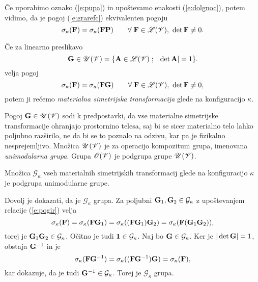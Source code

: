 Če uporabimo oznako (\ref{e:pupa}) in upoštevamo enakosti (\ref{e:dolgnoc}),
potem vidimo, da je pogoj (\ref{e:grarefc}) ekvivalenten pogoju
\begin{equation*}
	\sigma_{\kappa}(\mathbf F)=\sigma_{\kappa}(\mathbf F\mathbf P)\qquad
	\forall\;\mathbf F\in\mathscr L(\mathscr V),\ \det\mathbf F\neq 0.
\end{equation*}

\begin{definicija}
	Če za linearno preslikavo
	\[
		\ten{G}\in\mathscr{U}(\V)=\{\ten{A}\in\L(\V)\;;\ |\det\ten{A}|=1 \}.
	\]
	velja pogoj
	\begin{equation} \label{e:pogir}
		\sigma_{\kappa}(\mathbf F)=\sigma_{\kappa}(\mathbf F\mathbf G)\qquad
		\forall\;\mathbf F\in\mathscr L(\mathscr V),\ \det\mathbf F\neq 0,
	\end{equation}
	potem ji rečemo \emph{materialna simetrijska transformacija} glede na konfiguracijo $\kappa$.
\end{definicija}

Pogoj $\mathbf G\in\mathscr{U}(\mathscr V)$ sodi k predpostavki,
da vse materialne simetrijske transformacije ohranjajo prostornino telesa,
saj bi se sicer materialno telo lahko poljubno razši\-rilo, ne da bi se to poznalo na odzivu,
kar pa je fizikalno nesprejemljivo.
Množica $\mathscr{U}(\mathscr V)$ je za operacijo kompozitum grupa, imenovana \emph{unimodularna grupa}.
Grupa $\mathscr{O}(\mathscr V)$ je podgrupa grupe $\mathscr{U}(\mathscr V)$.

\begin{izrek}
	Množica $\mathcal{G}_{\kappa}$ vseh materialnih simetrijskih transformacij glede
	na konfiguracijo $\kappa$ je podgrupa unimodularne grupe.
\end{izrek}

\proof
	Dovolj je dokazati, da je $\mathcal{G}_{\kappa}$ grupa. Za poljubni $\mathbf G_1,\mathbf G_2\in\mathcal{G}_{\kappa}$
	z upoštevanjem relacije (\ref{e:pogir}) velja
	\[
		\sigma_{\kappa}(\mathbf F)=\sigma_{\kappa}(\mathbf F\mathbf G_1)
		=\sigma_{\kappa}((\mathbf F\mathbf G_1)\mathbf G_2)=\sigma_{\kappa}(\mathbf F(\mathbf G_1\mathbf G_2)),
	\]
	torej je $\mathbf G_1\mathbf G_2\in\mathcal{G}_{\kappa}$. Očitno je tudi $\mathbf 1\in\mathcal{G}_{\kappa}$.
	Naj bo $\mathbf G\in\mathcal{G}_{\kappa}$. Ker je $|\det\mathbf G|=1$, obstaja $\mathbf G^{-1}$ in je
	\[
		\sigma_{\kappa}(\mathbf F\mathbf G^{-1})=\sigma_{\kappa}((\mathbf F\mathbf G^{-1})\mathbf G)
		=\sigma_{\kappa}(\mathbf F),
	\]
	kar dokazuje, da je tudi $\mathbf G^{-1}\in\mathcal{G}_{\kappa}$. Torej je $\mathcal{G}_{\kappa}$ grupa.
\endproof

